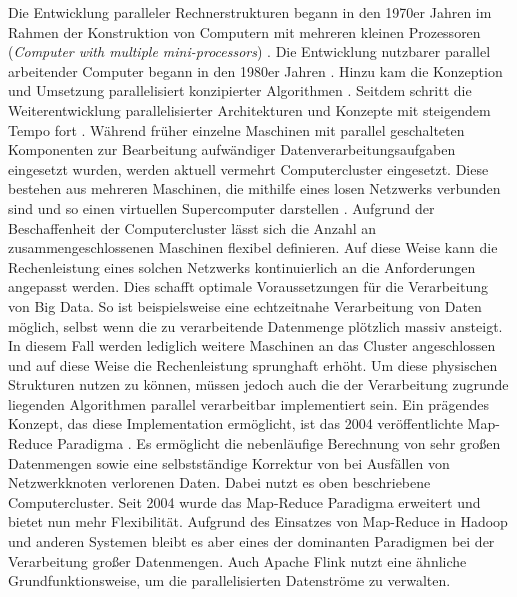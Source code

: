 Die Entwicklung paralleler Rechnerstrukturen begann in den 1970er Jahren im Rahmen der Konstruktion von Computern mit mehreren kleinen Prozessoren (\textit{Computer with multiple mini-processors}) \cite{Bell1971, Wulf1972}. Die Entwicklung nutzbarer parallel arbeitender Computer begann in den 1980er Jahren \cite{Seitz1985}. Hinzu kam die Konzeption und Umsetzung parallelisiert konzipierter Algorithmen \cite{Borodin1985}. Seitdem schritt die Weiterentwicklung parallelisierter Architekturen und Konzepte mit steigendem Tempo fort \cite{Trew2012}. Während früher einzelne Maschinen mit parallel geschalteten Komponenten zur Bearbeitung aufwändiger Datenverarbeitungsaufgaben eingesetzt wurden, werden aktuell vermehrt Computercluster eingesetzt. Diese bestehen aus mehreren Maschinen, die mithilfe eines losen Netzwerks verbunden sind und so einen virtuellen Supercomputer darstellen \cite{Hwang2013}. Aufgrund der Beschaffenheit der Computercluster lässt sich die Anzahl an zusammengeschlossenen Maschinen flexibel definieren. Auf diese Weise kann die Rechenleistung eines solchen Netzwerks kontinuierlich an die Anforderungen angepasst werden. Dies schafft optimale Voraussetzungen für die Verarbeitung von Big Data. So ist beispielsweise eine echtzeitnahe Verarbeitung von Daten möglich, selbst wenn die zu verarbeitende Datenmenge plötzlich massiv ansteigt. In diesem Fall werden lediglich weitere Maschinen an das Cluster angeschlossen und auf diese Weise die Rechenleistung sprunghaft erhöht. Um diese physischen Strukturen nutzen zu können, müssen jedoch auch die der Verarbeitung zugrunde liegenden Algorithmen parallel verarbeitbar implementiert sein. Ein prägendes Konzept, das diese Implementation ermöglicht, ist das 2004 veröffentlichte Map-Reduce Paradigma \cite{Dean2004}. Es ermöglicht die nebenläufige Berechnung von sehr großen Datenmengen sowie eine selbstständige Korrektur von bei Ausfällen von Netzwerkknoten verlorenen Daten. Dabei nutzt es oben beschriebene Computercluster. Seit 2004 wurde das Map-Reduce Paradigma erweitert und bietet nun mehr Flexibilität. Aufgrund des Einsatzes von Map-Reduce in Hadoop \cite{HadoopWebsite} und anderen Systemen bleibt es aber eines der dominanten Paradigmen bei der Verarbeitung großer Datenmengen. Auch Apache Flink \cite{FlinkWebsite} nutzt eine ähnliche Grundfunktionsweise, um die parallelisierten Datenströme zu verwalten.

